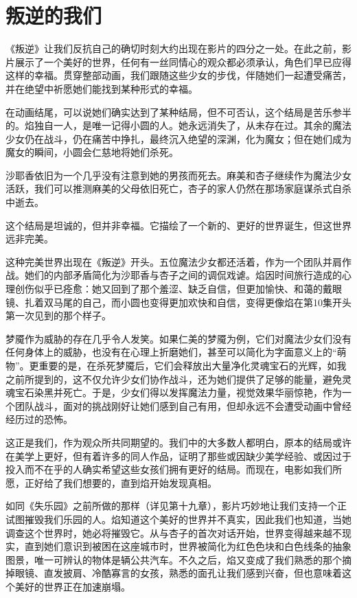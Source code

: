 \chapter{叛逆的我们}
《叛逆》让我们反抗自己的确切时刻大约出现在影片的四分之一处。在此之前，影片展示了一个美好的世界，任何有一丝同情心的观众都必须承认，角色们早已应得这样的幸福。贯穿整部动画，我们跟随这些少女的步伐，伴随她们一起遭受痛苦，并在绝望中祈愿她们能找到某种形式的幸福。

在动画结尾，可以说她们确实达到了某种结局，但不可否认，这个结局是苦乐参半的。焰独自一人，是唯一记得小圆的人。她永远消失了，从未存在过。其余的魔法少女仍在战斗，仍在痛苦中挣扎，最终沉入绝望的深渊，化为魔女；但在她们成为魔女的瞬间，小圆会仁慈地将她们杀死。

沙耶香依旧为一个几乎没有注意到她的男孩而死去。麻美和杏子继续作为魔法少女活跃，我们可以推测麻美的父母依旧死亡，杏子的家人仍然在那场家庭谋杀式自杀中逝去。

这个结局是坦诚的，但并非幸福。它描绘了一个新的、更好的世界诞生，但这世界远非完美。

这种完美世界出现在《叛逆》开头。五位魔法少女都还活着，作为一个团队并肩作战。她们的内部矛盾简化为沙耶香与杏子之间的调侃戏谑。焰因时间旅行造成的心理创伤似乎已痊愈：她又回到了那个羞涩、缺乏自信，但更加愉快、和蔼的戴眼镜、扎着双马尾的自己，而小圆也变得更加欢快和自信，变得更像焰在第10集开头第一次见到的那个样子。

梦魇作为威胁的存在几乎令人发笑。如果仁美的梦魇为例，它们对魔法少女们没有任何身体上的威胁，也没有在心理上折磨她们，甚至可以简化为字面意义上的“萌物”。更重要的是，在杀死梦魇后，它们会释放出大量净化灵魂宝石的光辉，如我之前所提到的，这不仅允许少女们协作战斗，还为她们提供了足够的能量，避免灵魂宝石染黑并死亡。于是，少女们得以发挥魔法力量，视觉效果华丽惊艳，作为一个团队战斗，面对的挑战刚好让她们感到自己有用，但却永远不会遭受动画中曾经经历过的恐怖。

这正是我们，作为观众所共同期望的。我们中的大多数人都明白，原本的结局或许在美学上更好，但有着许多的同人作品，证明了那些或因缺少美学经验、或因过于投入而不在乎的人确实希望这些女孩们拥有更好的结局。而现在，电影如我们所愿，正好给了我们想要的，直到焰开始发现真相。

如同《失乐园》之前所做的那样（详见第十九章），影片巧妙地让我们支持一个正试图摧毁我们乐园的人。焰知道这个美好的世界并不真实，因此我们也知道，当她调查这个世界时，她必将摧毁它。从与杏子的首次对话开始，世界变得越来越不现实，直到她们意识到被困在这座城市时，世界被简化为红色色块和白色线条的抽象图景，唯一可辨认的物体是辆公共汽车。不久之后，焰又变成了我们熟悉的那个摘掉眼镜、直发披肩、冷酷寡言的女孩，熟悉的面孔让我们感到兴奋，但也意味着这个美好的世界正在加速崩塌。


